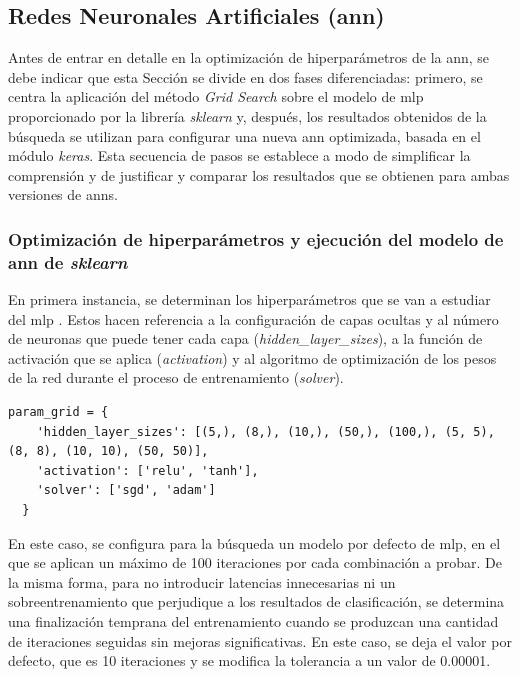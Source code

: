 \subsection{Redes Neuronales Artificiales (\acrshort{ann})}
\label{sec:ann}

Antes de entrar en detalle en la optimización de hiperparámetros de la \gls{ann}, se debe indicar que esta Sección se divide en dos fases diferenciadas: primero, se centra la aplicación del método \textit{Grid Search} sobre el modelo de \gls{mlp} proporcionado por la librería \textit{sklearn} y, después, los resultados obtenidos de la búsqueda  se utilizan para configurar una nueva \gls{ann} optimizada, basada en el módulo \textit{keras}. Esta secuencia de pasos se establece a modo de simplificar la comprensión y de justificar y comparar los resultados que se obtienen para ambas versiones de \gls{ann}s.

\subsubsection{Optimización de hiperparámetros y ejecución del modelo de \acrshort{ann} de \textit{sklearn}}

En primera instancia, se determinan los hiperparámetros que se van a estudiar del \gls{mlp} \cite{mlp}. Estos hacen referencia a la configuración de capas ocultas y al número de neuronas que puede tener cada capa (\textit{hidden\_layer\_sizes}), a la función de activación que se aplica (\textit{activation}) y al algoritmo de optimización de los pesos de la red durante el proceso de entrenamiento (\textit{solver}). 

\vspace{3mm}

\begin{lstlisting}[style=Python, caption={Cuadrícula de parámetros MLP}]
  param_grid = {
    'hidden_layer_sizes': [(5,), (8,), (10,), (50,), (100,), (5, 5), (8, 8), (10, 10), (50, 50)],  
    'activation': ['relu', 'tanh'],
    'solver': ['sgd', 'adam']
  }
\end{lstlisting}

\vspace{3mm}

En este caso, se configura para la búsqueda un modelo por defecto de \gls{mlp}, en el que se aplican un máximo de 100 iteraciones por cada combinación a probar. De la misma forma, para no introducir latencias innecesarias ni un sobreentrenamiento que perjudique a los resultados de clasificación, se determina una finalización temprana del entrenamiento cuando se produzcan una cantidad de iteraciones seguidas sin mejoras significativas. En este caso, se deja el valor por defecto, que es 10 iteraciones y se modifica la tolerancia a un valor de 0.00001.

